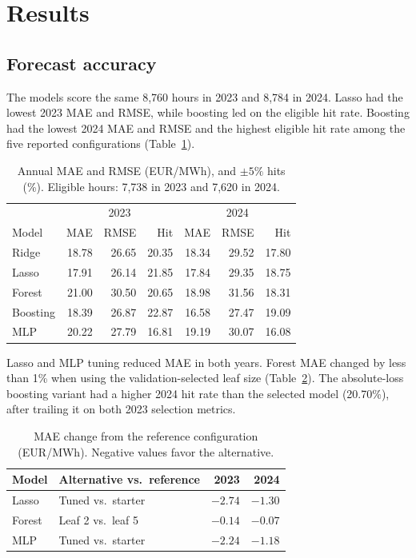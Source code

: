 \section{Results}
\subsection{Forecast accuracy}
The models score the same 8,760 hours in 2023 and 8,784 in 2024.
Lasso had the lowest 2023 MAE and RMSE, while boosting led on the
eligible hit rate. Boosting had the lowest 2024 MAE and RMSE and the
highest eligible hit rate among the five reported configurations
(Table~\ref{tab:forecast}).

\begin{table}[!t]
\centering
\caption{Annual MAE and RMSE (EUR/MWh), and \(\pm5\%\) hits (\%).
Eligible hours: 7,738 in 2023 and 7,620 in 2024.}
\label{tab:forecast}
\setlength{\tabcolsep}{3pt}
\begin{tabular}{lrrrrrr}
\hline
& \multicolumn{3}{c}{2023} & \multicolumn{3}{c}{2024}\\
Model & MAE & RMSE & Hit & MAE & RMSE & Hit\\
\hline
Ridge & 18.78 & 26.65 & 20.35 & 18.34 & 29.52 & 17.80\\
Lasso & 17.91 & 26.14 & 21.85 & 17.84 & 29.35 & 18.75\\
Forest & 21.00 & 30.50 & 20.65 & 18.98 & 31.56 & 18.31\\
Boosting & 18.39 & 26.87 & 22.87 & 16.58 & 27.47 & 19.09\\
MLP & 20.22 & 27.79 & 16.81 & 19.19 & 30.07 & 16.08\\
\hline
\end{tabular}
\end{table}

Lasso and MLP tuning reduced MAE in both years. Forest MAE changed
by less than 1\% when using the validation-selected leaf size
(Table~\ref{tab:tuning}). The absolute-loss boosting variant had a
higher 2024 hit rate than the selected model (20.70\%), after trailing
it on both 2023 selection metrics.

\begin{table}[!t]
\centering
\caption{MAE change from the reference configuration (EUR/MWh).
Negative values favor the alternative.}
\label{tab:tuning}
\setlength{\tabcolsep}{4pt}
\begin{tabular}{llrr}
\hline
Model & Alternative vs.\ reference & 2023 & 2024\\
\hline
Lasso & Tuned vs.\ starter & $-2.74$ & $-1.30$\\
Forest & Leaf 2 vs.\ leaf 5 & $-0.14$ & $-0.07$\\
MLP & Tuned vs.\ starter & $-2.24$ & $-1.18$\\
\hline
\end{tabular}
\end{table}

